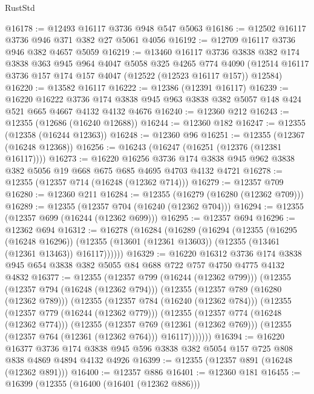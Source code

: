 \begin{lexlean}{RustStd}
\begin{coremodule}
@16178 := @12493 @16117 @3736 @948 @547 @5063
@16186 := @12502 @16117 @3736 @946 @371 @382 @27 @5061 @4056
@16192 := @12709 @16117 @3736 @946 @382 @4657 @5059
@16219 := @13460
    @16117
    @3736
    @3838
    @382
    @174
    @3838
    @363
    @945
    @964
    @4047
    @5058
    @325
    @4265
    @774
    @4090
    (@12514 @16117 @3736 @157 @174 @157 @4047 (@12522 (@12523 @16117 @157)) @12584)
@16220 := @13582 @16117
@16222 := @12386 (@12391 @16117)
@16239 := @16220
    @16222
    @3736
    @174
    @3838
    @945
    @963
    @3838
    @382
    @5057
    @148
    @424
    @521
    @665
    @4667
    @4132
    @4132
    @4676
@16240 := @12360 @212
@16243 := @12355 (@12686 (@16240 @12688))
@16244 := @12360 @182
@16247 := @12355 (@12358 (@16244 @12363))
@16248 := @12360 @96
@16251 := @12355 (@12367 (@16248 @12368))
@16256 := @16243 (@16247 (@16251 (@12376 (@12381 @16117))))
@16273 := @16220
    @16256
    @3736
    @174
    @3838
    @945
    @962
    @3838
    @382
    @5056
    @19
    @668
    @675
    @685
    @4695
    @4703
    @4132
    @4721
@16278 := @12355 (@12357 @714 (@16248 (@12362 @714)))
@16279 := @12357 @709
@16280 := @12360 @211
@16284 := @12355 (@16279 (@16280 (@12362 @709)))
@16289 := @12355 (@12357 @704 (@16240 (@12362 @704)))
@16294 := @12355 (@12357 @699 (@16244 (@12362 @699)))
@16295 := @12357 @694
@16296 := @12362 @694
@16312 := @16278
    (@16284
      (@16289
        (@16294
          (@12355
            (@16295 (@16248 @16296))
            (@12355 (@13601 (@12361 @13603)) (@12355 (@13461 (@12361 @13463)) @16117))))))
@16329 := @16220
    @16312
    @3736
    @174
    @3838
    @945
    @654
    @3838
    @382
    @5055
    @84
    @688
    @722
    @757
    @4750
    @4775
    @4132
    @4832
@16377 := @12355
    (@12357 @799 (@16244 (@12362 @799)))
    (@12355
      (@12357 @794 (@16248 (@12362 @794)))
      (@12355
        (@12357 @789 (@16280 (@12362 @789)))
        (@12355
          (@12357 @784 (@16240 (@12362 @784)))
          (@12355
            (@12357 @779 (@16244 (@12362 @779)))
            (@12355
              (@12357 @774 (@16248 (@12362 @774)))
              (@12355
                (@12357 @769 (@12361 (@12362 @769)))
                (@12355 (@12357 @764 (@12361 (@12362 @764))) @16117)))))))
@16394 := @16220
    @16377
    @3736
    @174
    @3838
    @945
    @596
    @3838
    @382
    @5054
    @157
    @725
    @808
    @838
    @4869
    @4894
    @4132
    @4926
@16399 := @12355 (@12357 @891 (@16248 (@12362 @891)))
@16400 := @12357 @886
@16401 := @12360 @181
@16455 := @16399
    (@12355
      (@16400 (@16401 (@12362 @886)))

\end{coremodule}
\end{lexlean}
